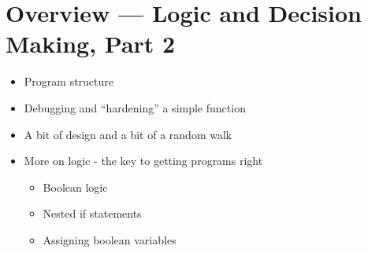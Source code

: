 \documentclass[letterpaper,10pt,english]{sphinxmanual}
\begin{document}
\section{Overview — Logic and Decision Making, Part 2}
\label{\detokenize{lecture_notes/lec11_conditionals2:overview-logic-and-decision-making-part-2}}\begin{itemize}
\item {} 
Program structure

\item {} 
Debugging and “hardening” a simple function

\item {} 
A bit of design and a bit of a random walk

\item {} 
More on logic - the key to getting programs right
\begin{itemize}
\item {} 
Boolean logic

\item {} 
Nested if statements

\item {} 
Assigning boolean variables

\end{itemize}

\end{itemize}
\end{document}
